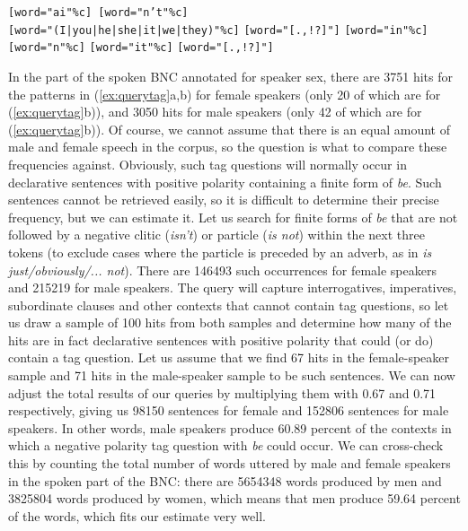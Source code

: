 \begin{exe}
\ex
\begin{xlist}
\label{ex:querymoretag}
\ex \texttt{[word="ai"\%c] [word="n't"\%c]} \\
\texttt{[word="(I|you|he|she|it|we|they)"\%c]} \texttt{[word="[.,!?]"]}
\ex \texttt{[word="in"\%c]} \texttt{[word="n"\%c]} \texttt{[word="it"\%c]} \texttt{[word="[.,!?]"]}
\end{xlist}
\end{exe}

In the part of the spoken  BNC  annotated  for speaker sex,  there are \num{3751} hits for the patterns in (\ref{ex:querytag}a,b) for female speakers (only 20 of which are for (\ref{ex:querytag}b)), and \num{3050} hits for male speakers (only 42 of which are for (\ref{ex:querytag}b)). Of course, we cannot assume that there is an equal amount of male and female speech in the corpus, so the question is what to compare these frequencies  against. Obviously, such tag questions  will normally occur in declarative sentences with positive polarity containing a finite form of \textit{be}. Such sentences cannot be retrieved  easily, so it is difficult to determine their precise frequency, but we can estimate it. Let us search for finite forms of \textit{be} that are not followed by a negative  clitic  (\textit{isn't}) or particle (\textit{is not}) within the next three tokens (to exclude cases where the particle is preceded by an adverb,  as in \textit{is just\slash obviously/... not}). There are \num{146493} such occurrences for female speakers and \num{215219} for male speakers. The query will capture interrogatives, imperatives, subordinate clauses and other contexts that cannot contain tag questions, so let us draw a sample of 100 hits from both samples and determine how many of the hits are in fact declarative sentences with positive polarity that could (or do) contain a tag question. Let us assume that we find 67 hits in the female\hyp{}speaker sample and 71 hits in the male\hyp{}speaker sample to be such sentences. We can now adjust the total results of our queries by multiplying them with 0.67 and 0.71 respectively, giving us \num{98150} sentences for female and \num{152806} sentences for male speakers.  In other words, male speakers produce 60.89 percent of the contexts in which a negative  polarity tag question  with \textit{be} could occur. We can cross\hyp{}check this by counting the total number of words uttered by male and female speakers in the spoken part of the BNC:  there are \num{5654348} words produced by men and \num{3825804} words produced by women, which means that men produce 59.64 percent of the words, which fits our estimate very well.

